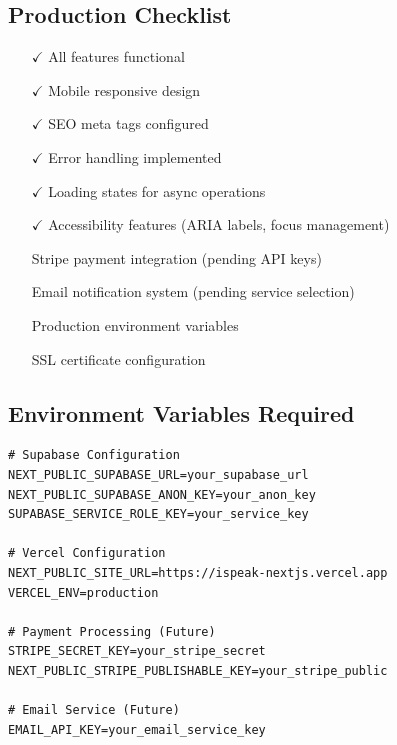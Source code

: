 \documentclass[11pt,a4paper]{article}
\begin{document}
\subsection{Production Checklist}
\begin{itemize}[leftmargin=*,itemsep=5pt]
    \item [$\checkmark$] All features functional
    \item [$\checkmark$] Mobile responsive design
    \item [$\checkmark$] SEO meta tags configured
    \item [$\checkmark$] Error handling implemented
    \item [$\checkmark$] Loading states for async operations
    \item [$\checkmark$] Accessibility features (ARIA labels, focus management)
    \item [ ] Stripe payment integration (pending API keys)
    \item [ ] Email notification system (pending service selection)
    \item [ ] Production environment variables
    \item [ ] SSL certificate configuration
\end{itemize}

\subsection{Environment Variables Required}
\begin{lstlisting}[caption=Required Environment Variables]
# Supabase Configuration
NEXT_PUBLIC_SUPABASE_URL=your_supabase_url
NEXT_PUBLIC_SUPABASE_ANON_KEY=your_anon_key
SUPABASE_SERVICE_ROLE_KEY=your_service_key

# Vercel Configuration
NEXT_PUBLIC_SITE_URL=https://ispeak-nextjs.vercel.app
VERCEL_ENV=production

# Payment Processing (Future)
STRIPE_SECRET_KEY=your_stripe_secret
NEXT_PUBLIC_STRIPE_PUBLISHABLE_KEY=your_stripe_public

# Email Service (Future)
EMAIL_API_KEY=your_email_service_key
\end{lstlisting}
\end{document}
